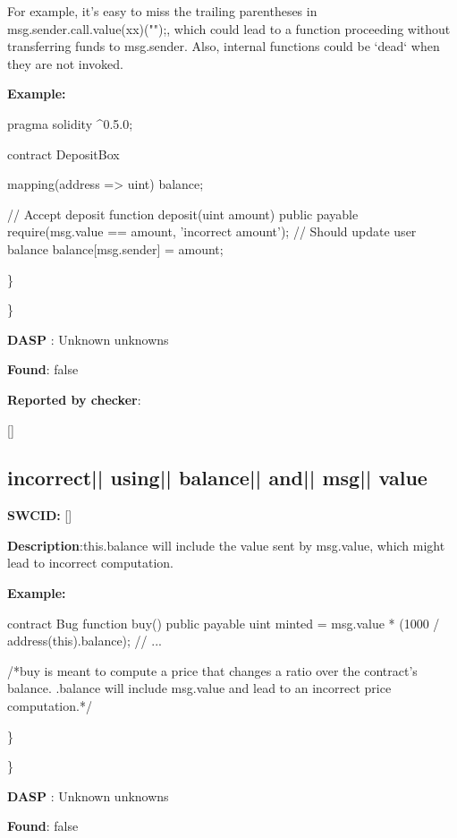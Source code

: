 \documentclass{article}
\begin{document}
For example, it's easy to miss the trailing parentheses in msg.sender.call.value(xx)("");, which could lead to a function proceeding without transferring funds to msg.sender. Also, internal functions could be `dead` when they are not invoked.


\textbf{Example:} 
\begin{ffcode} 

pragma solidity ^0.5.0;

contract DepositBox {
    mapping(address => uint) balance;

    // Accept deposit
    function deposit(uint amount) public payable {
        require(msg.value == amount, 'incorrect amount');
        // Should update user balance
        balance[msg.sender] = amount;
    }
}

\end{ffcode} 
\} 

\} 

\textbf{DASP} : Unknown unknowns

\textbf{Found}: false

\textbf{Reported by checker}: 
\begin{ffcode} 

[]
\end{ffcode} 
\subsection{incorrect{|\textunderscore| }using{|\textunderscore| }balance{|\textunderscore| }and{|\textunderscore| }msg{|\textunderscore| }value} 
\textbf{SWC{\textunderscore }ID:} []

\textbf{Description}:this.balance will include the value sent by msg.value, which might lead to incorrect computation.


\textbf{Example:} 
\begin{ffcode} 

contract Bug{
  function buy() public payable{
    uint minted = msg.value * (1000 / address(this).balance);
    // ...
  }
}

 /*buy is meant to compute a price that changes a ratio over the contract's balance. .balance will include msg.value and lead to an incorrect price computation.*/ 

\end{ffcode} 
\} 

\} 

\textbf{DASP} : Unknown unknowns

\textbf{Found}: false
\end{document}
